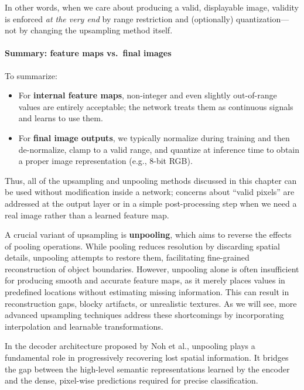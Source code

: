 \medskip

In other words, when we care about producing a valid, displayable image, validity is enforced \emph{at the very end} by range restriction and (optionally) quantization—not by changing the upsampling method itself.

\paragraph{Summary: feature maps vs.\ final images}
\noindent
To summarize:
\begin{itemize}
	\item For \textbf{internal feature maps}, non-integer and even slightly out-of-range values are entirely acceptable; the network treats them as continuous signals and learns to use them.
	\item For \textbf{final image outputs}, we typically normalize during training and then de-normalize, clamp to a valid range, and quantize at inference time to obtain a proper image representation (e.g., 8-bit RGB).
\end{itemize}

\medskip

Thus, all of the upsampling and unpooling methods discussed in this chapter can be used without modification inside a network; concerns about ``valid pixels'' are addressed at the output layer or in a simple post-processing step when we need a real image rather than a learned feature map.

\newpage

\noindent A crucial variant of upsampling is \textbf{unpooling}, which aims to reverse the effects of pooling operations. While pooling reduces resolution by discarding spatial details, unpooling attempts to restore them, facilitating fine-grained reconstruction of object boundaries. However, unpooling alone is often insufficient for producing smooth and accurate feature maps, as it merely places values in predefined locations without estimating missing information. This can result in reconstruction gaps, blocky artifacts, or unrealistic textures. As we will see, more advanced upsampling techniques address these shortcomings by incorporating interpolation and learnable transformations.

\noindent In the decoder architecture proposed by Noh et al., unpooling plays a fundamental role in progressively recovering lost spatial information. It bridges the gap between the high-level semantic representations learned by the encoder and the dense, pixel-wise predictions required for precise classification.

